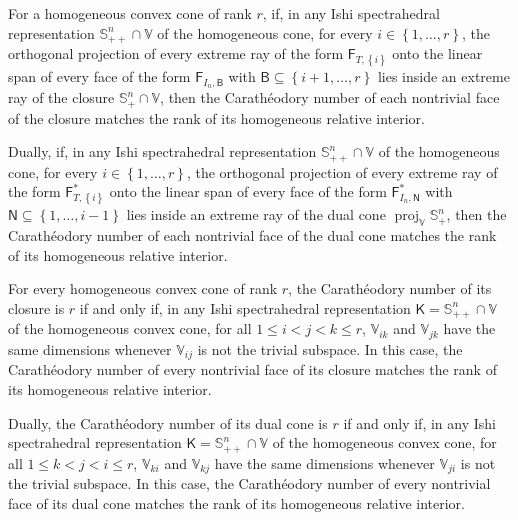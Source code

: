 \documentclass[10pt,a4paper]{amsart}
\DeclareMathOperator{\proj}{proj}
\begin{document}
\begin{proposition}\label{proposition:Caratheodorynumberssufficient}
For a homogeneous convex cone of rank $r$, if, in any Ishi spectrahedral
representation $\mathbb{S}^{n}_{++} \cap \mathbb{V}$ of the homogeneous
cone, for every $i \in \left\{1, \dotsc, r\right\}$, the orthogonal
projection of every extreme ray of the form
$\mathsf{F}_{T,\left\{i\right\}}$ onto the linear span of every face of the
form $\mathsf{F}_{I_{n},\mathsf{B}}$ with $\mathsf{B} \subseteq \left\{i+1,
\dotsc, r\right\}$ lies inside an extreme ray of the closure
$\mathbb{S}^{n}_{+} \cap \mathbb{V}$, then the Carath\'eodory number of
each nontrivial face of the closure matches the rank of its homogeneous
relative interior.

Dually, if, in any Ishi spectrahedral representation $\mathbb{S}^{n}_{++}
\cap \mathbb{V}$ of the homogeneous cone, for every $i \in \left\{1,
\dotsc, r\right\}$, the orthogonal projection of every extreme ray of the
form $\mathsf{F}^{*}_{T,\left\{i\right\}}$ onto the linear span of every
face of the form $\mathsf{F}^{*}_{I_{n},\mathsf{N}}$ with $\mathsf{N}
\subseteq \left\{1, \dotsc, i-1\right\}$ lies inside an extreme ray of the
dual cone $\proj_{\mathbb{V}} \mathbb{S}^{n}_{+}$, then the Carath\'eodory
number of each nontrivial face of the dual cone matches the rank of its
homogeneous relative interior.
\end{proposition}

\begin{theorem}\label{theorem:characterizationofrankmatchingcaratheodorynumber}
For every homogeneous convex cone of rank $r$, the Carath\'eodory number of
its closure is $r$ if and only if, in any Ishi spectrahedral representation
$\mathsf{K} = \mathbb{S}^{n}_{++} \cap \mathbb{V}$ of the homogeneous
convex cone, for all $1 \leq i < j < k \leq r$, $\mathbb{V}_{ik}$ and
$\mathbb{V}_{jk}$ have the same dimensions whenever $\mathbb{V}_{ij}$ is
not the trivial subspace. In this case, the Carath\'eodory number of every
nontrivial face of its closure matches the rank of its homogeneous relative
interior.

Dually, the Carath\'eodory number of its dual cone is $r$ if and only if,
in any Ishi spectrahedral representation $\mathsf{K} = \mathbb{S}^{n}_{++}
\cap \mathbb{V}$ of the homogeneous convex cone, for all $1 \leq k < j < i
\leq r$, $\mathbb{V}_{ki}$ and $\mathbb{V}_{kj}$ have the same dimensions
whenever $\mathbb{V}_{ji}$ is not the trivial subspace. In this case, the
Carath\'eodory number of every nontrivial face of its dual cone matches the
rank of its homogeneous relative interior.
\end{theorem}
\end{document}
